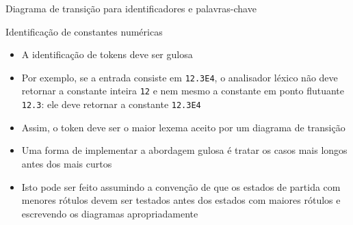 \begin{frame}[fragile]{Diagrama de transição para identificadores e palavras-chave}

    \begin{figure}
        \centering

    \end{figure}

\end{frame}

\begin{frame}[fragile]{Identificação de constantes numéricas}

    \begin{itemize}
        \item A identificação de tokens deve ser gulosa
        \pause

        \item Por exemplo, se a entrada consiste em \texttt{12.3E4}, o analisador léxico não deve retornar a constante inteira \texttt{12} e nem mesmo a
            constante em ponto flutuante \texttt{12.3}: ele deve retornar a constante \texttt{12.3E4}
        \pause

        \item Assim, o token deve ser o maior lexema aceito por um diagrama de transição
        \pause

        \item Uma forma de implementar a abordagem gulosa é tratar os casos mais longos antes dos mais curtos
        \pause

        \item Isto pode ser feito assumindo a convenção de que os estados de partida com menores rótulos devem ser testados antes dos estados com maiores
            rótulos e escrevendo os diagramas apropriadamente
    \end{itemize}

\end{frame}

